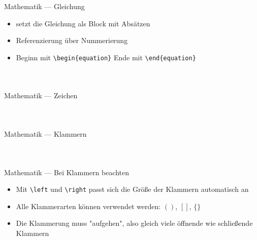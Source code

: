 \documentclass[presentation,aspectratio=169]{beamer}
\begin{document}
\begin{frame}[fragile]{Mathematik --- Gleichung}
  \begin{itemize}
    \item setzt die Gleichung als Block mit Absätzen
    \item Referenzierung über Nummerierung
    \item Beginn mit \verb|\begin{equation}| Ende mit \verb|\end{equation}|
  \end{itemize}
  
  \begin{columns}
    \begin{column}{.4\textwidth}
      
    \end{column}
    \begin{column}{.5\textwidth}
      \inputminted{latex}{codebeispiele/math-equation.tex}
    \end{column}
  \end{columns}
\end{frame}

\begin{frame}[fragile]{Mathematik --- Zeichen}
  \begin{columns}
    \begin{column}{.4\textwidth}
      
    \end{column}
    \begin{column}{.5\textwidth}
      \inputminted{latex}{codebeispiele/math-symbols.tex}
    \end{column}
  \end{columns}
\end{frame}

\begin{frame}[fragile]{Mathematik --- Klammern}
  \begin{columns}
    \begin{column}{.3\textwidth}
      
    \end{column}
    \begin{column}{.6\textwidth}
      \inputminted{latex}{codebeispiele/math-brackets.tex}
    \end{column}
  \end{columns}
\end{frame}

\begin{frame}[fragile]{Mathematik --- Bei Klammern beachten}
  \begin{itemize}
    \item Mit \verb|\left| und \verb|\right| passt sich die Größe der Klammern automatisch an
    \item Alle Klammerarten können verwendet werden: $()$, $[]$, $\{\}$
    \item Die Klammerung muss "aufgehen", also gleich viele öffnende wie schließende Klammern
  \end{itemize}
\end{frame}
\end{document}
